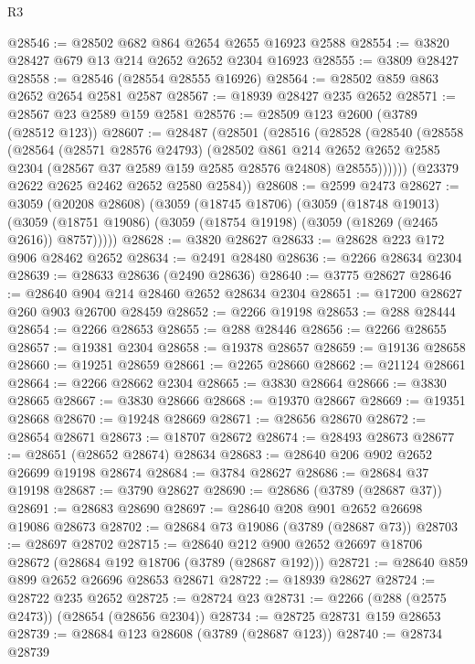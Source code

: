 \begin{lexlean}{R3}
\begin{coremodule}
@28546 := @28502 @682 @864 @2654 @2655 @16923 @2588
@28554 := @3820 @28427 @679 @13 @214 @2652 @2652 @2304 @16923
@28555 := @3809 @28427
@28558 := @28546 (@28554 @28555 @16926)
@28564 := @28502 @859 @863 @2652 @2654 @2581 @2587
@28567 := @18939 @28427 @235 @2652
@28571 := @28567 @23 @2589 @159 @2581
@28576 := @28509 @123 @2600 (@3789 (@28512 @123))
@28607 := @28487
    (@28501
      (@28516
        (@28528
          (@28540
            (@28558
              (@28564
                (@28571 @28576 @24793)
                (@28502
                  @861
                  @214
                  @2652
                  @2652
                  @2585
                  @2304
                  (@28567 @37 @2589 @159 @2585 @28576 @24808)
                  @28555))))))
      (@23379 @2622 @2625 @2462 @2652 @2580 @2584))
@28608 := @2599 @2473
@28627 := @3059
    (@20208 @28608)
    (@3059
      (@18745 @18706)
      (@3059
        (@18748 @19013)
        (@3059 (@18751 @19086) (@3059 (@18754 @19198) (@3059 (@18269 (@2465 @2616)) @8757)))))
@28628 := @3820 @28627
@28633 := @28628 @223 @172 @906 @28462 @2652
@28634 := @2491 @28480
@28636 := @2266 @28634 @2304
@28639 := @28633 @28636 (@2490 @28636)
@28640 := @3775 @28627
@28646 := @28640 @904 @214 @28460 @2652 @28634 @2304
@28651 := @17200 @28627 @260 @903 @26700 @28459
@28652 := @2266 @19198
@28653 := @288 @28444
@28654 := @2266 @28653
@28655 := @288 @28446
@28656 := @2266 @28655
@28657 := @19381 @2304
@28658 := @19378 @28657
@28659 := @19136 @28658
@28660 := @19251 @28659
@28661 := @2265 @28660
@28662 := @21124 @28661
@28664 := @2266 @28662 @2304
@28665 := @3830 @28664
@28666 := @3830 @28665
@28667 := @3830 @28666
@28668 := @19370 @28667
@28669 := @19351 @28668
@28670 := @19248 @28669
@28671 := @28656 @28670
@28672 := @28654 @28671
@28673 := @18707 @28672
@28674 := @28493 @28673
@28677 := @28651 (@28652 @28674) @28634
@28683 := @28640 @206 @902 @2652 @26699 @19198 @28674
@28684 := @3784 @28627
@28686 := @28684 @37 @19198
@28687 := @3790 @28627
@28690 := @28686 (@3789 (@28687 @37))
@28691 := @28683 @28690
@28697 := @28640 @208 @901 @2652 @26698 @19086 @28673
@28702 := @28684 @73 @19086 (@3789 (@28687 @73))
@28703 := @28697 @28702
@28715 := @28640 @212 @900 @2652 @26697 @18706 @28672 (@28684 @192 @18706 (@3789 (@28687 @192)))
@28721 := @28640 @859 @899 @2652 @26696 @28653 @28671
@28722 := @18939 @28627
@28724 := @28722 @235 @2652
@28725 := @28724 @23
@28731 := @2266 (@288 (@2575 @2473)) (@28654 (@28656 @2304))
@28734 := @28725 @28731 @159 @28653
@28739 := @28684 @123 @28608 (@3789 (@28687 @123))
@28740 := @28734 @28739

\end{coremodule}
\end{lexlean}
